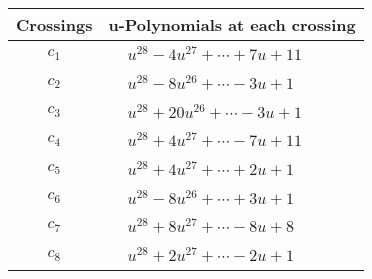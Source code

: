 \documentclass[1p]{elsarticle_modified}
\theoremstyle{definition}
\begin{document}
\begin{tabular}{m{50pt}|m{274pt}}
Crossings & \hspace{64pt}u-Polynomials at each crossing \\
\hline $$\begin{aligned}c_{1}\end{aligned}$$&$\begin{aligned}
&u^{28}-4 u^{27}+\cdots+7 u+11
\end{aligned}$\\
\hline $$\begin{aligned}c_{2}\end{aligned}$$&$\begin{aligned}
&u^{28}-8 u^{26}+\cdots-3 u+1
\end{aligned}$\\
\hline $$\begin{aligned}c_{3}\end{aligned}$$&$\begin{aligned}
&u^{28}+20 u^{26}+\cdots-3 u+1
\end{aligned}$\\
\hline $$\begin{aligned}c_{4}\end{aligned}$$&$\begin{aligned}
&u^{28}+4 u^{27}+\cdots-7 u+11
\end{aligned}$\\
\hline $$\begin{aligned}c_{5}\end{aligned}$$&$\begin{aligned}
&u^{28}+4 u^{27}+\cdots+2 u+1
\end{aligned}$\\
\hline $$\begin{aligned}c_{6}\end{aligned}$$&$\begin{aligned}
&u^{28}-8 u^{26}+\cdots+3 u+1
\end{aligned}$\\
\hline $$\begin{aligned}c_{7}\end{aligned}$$&$\begin{aligned}
&u^{28}+8 u^{27}+\cdots-8 u+8
\end{aligned}$\\
\hline $$\begin{aligned}c_{8}\end{aligned}$$&$\begin{aligned}
&u^{28}+2 u^{27}+\cdots-2 u+1
\end{aligned}$\\

\end{tabular}
\end{document}
